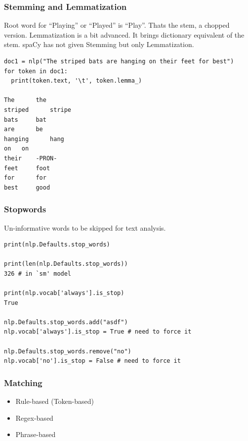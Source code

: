 \begin{frame}[fragile]\frametitle{ Stemming and Lemmatization}

Root word for ``Playing'' or ``Played'' is ``Play''. Thats the stem, a chopped version. Lemmatization is a bit advanced. It brings dictionary equivalent of the stem. spaCy has not given Stemming but only Lemmatization.


\begin{lstlisting}
doc1 = nlp("The striped bats are hanging on their feet for best")
for token in doc1:
  print(token.text, '\t', token.lemma_)
	
The 	 the
striped 	 stripe
bats 	 bat
are 	 be
hanging 	 hang
on 	 on
their 	 -PRON-
feet 	 foot
for 	 for
best 	 good
\end{lstlisting}


\end{frame}

\begin{frame}[fragile]\frametitle{Stopwords}
Un-informative words to be skipped for text analysis.

\begin{lstlisting}
print(nlp.Defaults.stop_words)

print(len(nlp.Defaults.stop_words))
326 # in `sm' model

print(nlp.vocab['always'].is_stop)
True

nlp.Defaults.stop_words.add("asdf")
nlp.vocab['always'].is_stop = True # need to force it

nlp.Defaults.stop_words.remove("no")
nlp.vocab['no'].is_stop = False # need to force it

\end{lstlisting}

\end{frame}

\begin{frame}[fragile]\frametitle{Matching }

  \begin{itemize}
    \item Rule-based (Token-based)
		\item Regex-based
		\item Phrase-based
  \end{itemize}
	

\end{frame}




